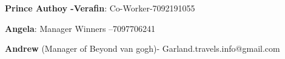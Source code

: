 \textbf{Prince Authoy -Verafin}: Co-Worker-7092191055

 \textbf{Angela}: Manager Winners --7097706241

\textbf{Andrew} (Manager of Beyond van gogh)- Garland.travels.info@gmail.com